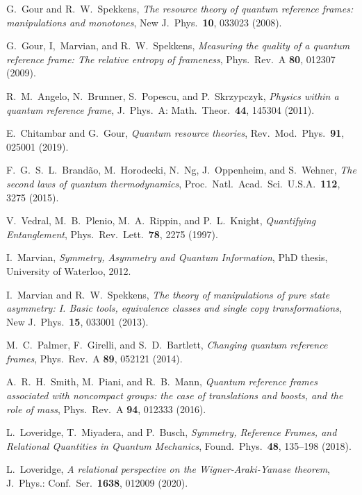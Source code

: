 \documentclass[aps,10pt,twocolumn,showpacs,pra,citeautoscript,amsmath,amssymb,floatfix,superscriptaddress]{revtex4-1}
\begin{document}
\begin{thebibliography}{47}
G.\ Gour and R.\ W.\ Spekkens, \emph{The resource theory of quantum reference frames: manipulations and monotones}, New J.\ Phys.\ \textbf{10}, 033023 (2008).

G.\ Gour, I,\ Marvian, and R.\ W.\ Spekkens, \emph{Measuring the quality of a quantum reference frame: The relative entropy of frameness}, Phys.\ Rev.\ A \textbf{80}, 012307 (2009).

R.\ M.\ Angelo, N.\ Brunner, S.\ Popescu, and P.\ Skrzypczyk, \emph{Physics within a quantum reference frame}, J.\ Phys.\ A: Math.\ Theor.\ \textbf{44}, 145304 (2011).

E.\ Chitambar and G.\ Gour, \emph{Quantum resource theories}, Rev.\ Mod.\ Phys.\ \textbf{91}, 025001 (2019).

F.\ G.\ S.\ L.\ Brand\~ao, M.\ Horodecki, N.\ Ng, J.\ Oppenheim, and S.\ Wehner, \emph{The second laws of quantum thermodynamics}, Proc.\ Natl.\ Acad.\ Sci.\ U.S.A.\ \textbf{112}, 3275 (2015).

V.\ Vedral, M.\ B.\ Plenio, M.\ A.\ Rippin, and P.\ L.\ Knight, \emph{Quantifying Entanglement}, Phys.\ Rev.\ Lett.\ \textbf{78}, 2275 (1997).

I.\ Marvian, \emph{Symmetry, Asymmetry and Quantum Information}, PhD thesis, University of Waterloo, 2012.

I.\ Marvian and R.\ W.\ Spekkens, \emph{The theory of manipulations of pure state asymmetry: I. Basic tools, equivalence classes and single copy transformations}, New J.\ Phys.\ \textbf{15}, 033001 (2013).

M.\ C.\ Palmer, F.\ Girelli, and S.\ D.\ Bartlett, \emph{Changing quantum reference frames}, Phys.\ Rev.\ A \textbf{89}, 052121 (2014).

A.\ R.\ H.\ Smith, M.\ Piani, and R.\ B.\ Mann, \emph{Quantum reference frames associated with noncompact groups: the case of translations and boosts, and the role of mass}, Phys.\ Rev.\ A \textbf{94}, 012333 (2016).

L.\ Loveridge, T.\ Miyadera, and P.\ Busch, \emph{Symmetry, Reference Frames, and Relational Quantities in Quantum Mechanics}, Found.\ Phys.\ \textbf{48}, 135--198 (2018).

L.\ Loveridge, \emph{A relational perspective on the Wigner-Araki-Yanase theorem}, J.\ Phys.: Conf.\ Ser.\ \textbf{1638}, 012009 (2020).


\end{thebibliography}
\end{document}
